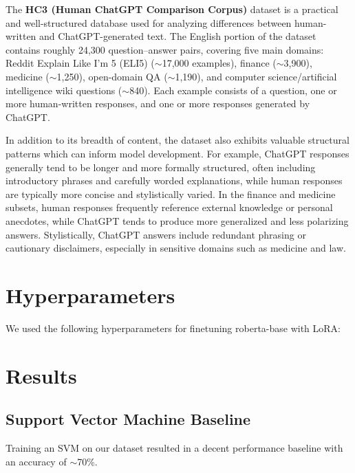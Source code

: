 \documentclass[11pt]{article}
\begin{document}
The \textbf{HC3 (Human ChatGPT Comparison Corpus)} dataset is a practical and well-structured database used for analyzing differences between human-written and ChatGPT-generated text. The English portion of the dataset contains roughly 24,300 question–answer pairs, covering five main domains: Reddit Explain Like I’m 5 (ELI5) ($\sim$17,000 examples), finance ($\sim$3,900), medicine ($\sim$1,250), open-domain QA ($\sim$1,190), and computer science/artificial intelligence wiki questions ($\sim$840). Each example consists of a question, one or more human-written responses, and one or more responses generated by ChatGPT. 

In addition to its breadth of content, the dataset also exhibits valuable structural patterns which can inform model development. For example, ChatGPT responses generally tend to be longer and more formally structured, often including introductory phrases and carefully worded explanations, while human responses are typically more concise and stylistically varied. In the finance and medicine subsets, human responses frequently reference external knowledge or personal anecdotes, while ChatGPT tends to produce more generalized and less polarizing answers.  Stylistically, ChatGPT answers include redundant phrasing or cautionary disclaimers, especially in sensitive domains such as medicine and law.





\section{Hyperparameters}

We used the following hyperparameters for finetuning roberta-base with LoRA:


\section{Results}
\subsection{Support Vector Machine Baseline}
\label{svm_results}
Training an SVM on our dataset resulted in a decent performance baseline with an accuracy of $\sim$70\%. 
\end{document}

